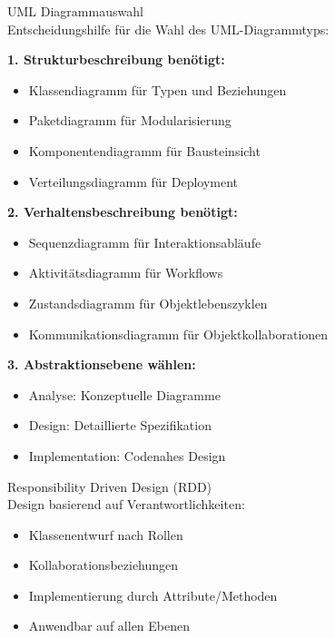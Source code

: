 \begin{KR}{UML Diagrammauswahl}\\
Entscheidungshilfe für die Wahl des UML-Diagrammtyps:

\textbf{1. Strukturbeschreibung benötigt:}
\begin{itemize}
    \item Klassendiagramm für Typen und Beziehungen
    \item Paketdiagramm für Modularisierung
    \item Komponentendiagramm für Bausteinsicht
    \item Verteilungsdiagramm für Deployment
\end{itemize}

\textbf{2. Verhaltensbeschreibung benötigt:}
\begin{itemize}
    \item Sequenzdiagramm für Interaktionsabläufe
    \item Aktivitätsdiagramm für Workflows
    \item Zustandsdiagramm für Objektlebenszyklen
    \item Kommunikationsdiagramm für Objektkollaborationen
\end{itemize}

\textbf{3. Abstraktionsebene wählen:}
\begin{itemize}
    \item Analyse: Konzeptuelle Diagramme
    \item Design: Detaillierte Spezifikation
    \item Implementation: Codenahes Design
\end{itemize}
\end{KR}

\begin{concept}{Responsibility Driven Design (RDD)}\\
Design basierend auf Verantwortlichkeiten:
\begin{itemize}
    \item Klassenentwurf nach Rollen
    \item Kollaborationsbeziehungen
    \item Implementierung durch Attribute/Methoden
    \item Anwendbar auf allen Ebenen
\end{itemize}
\end{concept}

